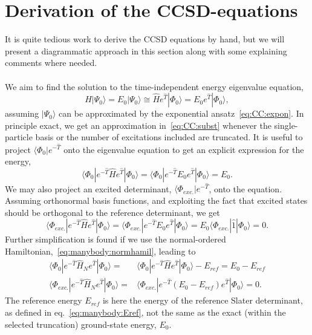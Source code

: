 \section{Derivation of the CCSD-equations}
It is quite tedious work to derive the CCSD equations by hand, but we will present a diagrammatic approach in this section along with some explaining comments where needed. 

\paragraph{}
We aim to find the solution to the time-independent energy eigenvalue equation,
\begin{equation}
\label{eq:CC:subst}
\hat{H} |\Psi_0 \rangle = E_0 |\Psi_0 \rangle
\cong
\hat{H} e^{\hat{T}} |\Phi_0 \rangle = E_0 e^{\hat{T}} |\Phi_0 \rangle ,
\end{equation}
assuming $|\Psi_0\rangle$ can be approximated by the exponential ansatz~\eqref{eq:CC:expon}.
In principle exact, we get an approximation in~\eqref{eq:CC:subst} whenever the single-particle basis or the number of excitations included are truncated.
It is useful to project $\langle \Phi_0 | e^{-\hat{T}}$ onto the eigenvalue equation to get an explicit expression for the energy,
\begin{equation}
\langle \Phi_0 | e^{-\hat{T}} \hat{H} e^{\hat{T}} |\Phi_0 \rangle 
=
\langle \Phi_0 | e^{-\hat{T}} E_0 e^{\hat{T}} |\Phi_0 \rangle
= E_0 .
\end{equation}
We may also project an excited determinant, $\langle \Phi_{exc.} | e^{-\hat{T}} $, onto the equation.
Assuming orthonormal basis functions, and exploiting the fact that excited states should be orthogonal to the reference determinant, we get
\begin{equation}
\langle \Phi_{exc.} | e^{-\hat{T}} \hat{H} e^{\hat{T}} |\Phi_0 \rangle 
=
\langle \Phi_{exc.} | e^{-\hat{T}} E_0 e^{\hat{T}} |\Phi_0 \rangle
=
E_0 \langle \Phi_{exc.} | \hat{1} |\Phi_0 \rangle
= 0 .
\end{equation}
Further simplification is found if we use the normal-ordered Hamiltonian,~\eqref{eq:manybody:normhamil}, leading to
\begin{equation}
\begin{split}
\langle \Phi_0 | e^{-\hat{T}} \hat{H}_N e^{\hat{T}} |\Phi_0 \rangle 
=&
\langle \Phi_0 | e^{-\hat{T}} \hat{H} e^{\hat{T}} |\Phi_0 \rangle - E_{ref}
=
E_0 - E_{ref} \\
\langle \Phi_{exc.} | e^{-\hat{T}} \hat{H}_N e^{\hat{T}} |\Phi_0 \rangle 
=&
\langle \Phi_{exc.} | e^{-\hat{T}} (E_0 - E_{ref}) e^{\hat{T}} |\Phi_0 \rangle
=
0 .
\end{split}
\end{equation}
The reference energy $E_{ref}$ is here the energy of the reference Slater determinant, as defined in eq.~\eqref{eq:manybody:Eref}, not the same as the exact (within the selected truncation) ground-state energy, $E_0$.


